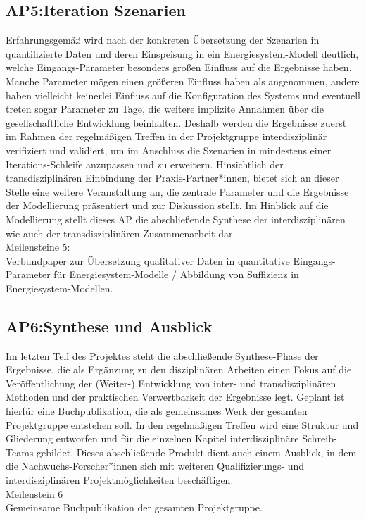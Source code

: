 \documentclass[a4paper,11pt,twoside]{scrartcl}
\begin{document}
\subsection*{AP5:Iteration Szenarien}
Erfahrungsgemäß wird nach der konkreten Übersetzung der Szenarien in quantifizierte Daten und deren Einspeisung in ein Energiesystem-Modell deutlich, welche Eingangs-Parameter besonders großen Einfluss auf die Ergebnisse haben. Manche Parameter mögen einen größeren Einfluss haben als angenommen, andere haben vielleicht keinerlei Einfluss auf die Konfiguration des Systems und eventuell treten sogar Parameter zu Tage, die weitere implizite Annahmen über die gesellschaftliche Entwicklung beinhalten. Deshalb werden die Ergebnisse zuerst im Rahmen der regelmäßigen Treffen in der Projektgruppe interdisziplinär verifiziert und validiert, um im Anschluss die Szenarien in mindestens einer Iterations-Schleife anzupassen und zu erweitern. Hinsichtlich der transdisziplinären Einbindung der Praxis-Partner*innen, bietet sich an dieser Stelle eine weitere Veranstaltung an, die zentrale Parameter und die Ergebnisse der Modellierung präsentiert und zur Diskussion stellt.
Im Hinblick auf die Modellierung stellt dieses AP die abschließende Synthese der interdisziplinären wie auch der transdisziplinären Zusammenarbeit dar.\\ 
Meilensteine 5: \\
Verbundpaper zur Übersetzung qualitativer Daten in quantitative Eingangs-Parameter für Energiesystem-Modelle / Abbildung von Suffizienz in Energiesystem-Modellen.

\subsection*{AP6:Synthese und Ausblick}
Im letzten Teil des Projektes steht die abschließende Synthese-Phase der Ergebnisse, die als Ergänzung zu den disziplinären Arbeiten einen Fokus auf die Veröffentlichung der (Weiter-) Entwicklung von inter- und transdisziplinären Methoden und der praktischen Verwertbarkeit der Ergebnisse legt. Geplant ist hierfür eine Buchpublikation, die als gemeinsames Werk der gesamten Projektgruppe entstehen soll. In den regelmäßigen Treffen wird eine Struktur und Gliederung entworfen und für die einzelnen Kapitel interdisziplinäre Schreib-Teams gebildet. Dieses abschließende Produkt dient auch einem Ausblick, in dem die Nachwuchs-Forscher*innen sich mit weiteren Qualifizierungs- und interdisziplinären Projektmöglichkeiten beschäftigen.\\
Meilenstein 6\\
Gemeinsame Buchpublikation der gesamten Projektgruppe.
\end{document}
